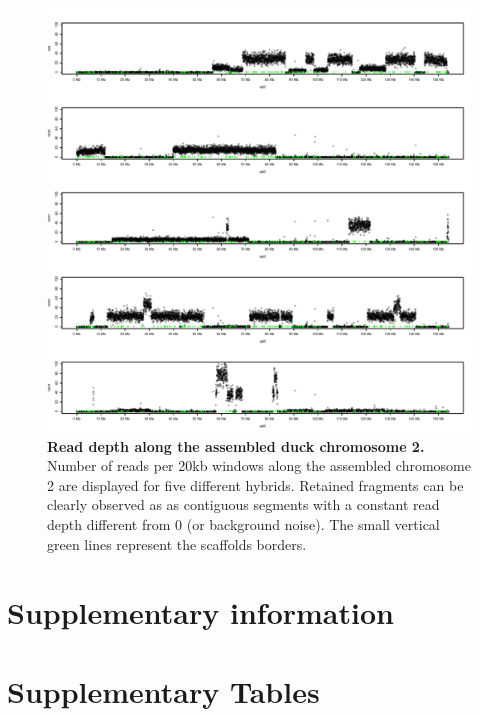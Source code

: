 \documentclass[10pt,letterpaper]{article}
\DeclareRobustCommand{\csentence}[1]{
    {\mathversion{bold}\bfseries #1}}
\begin{document}
\begin{figure}[h!]
   \includegraphics[scale=0.7]{figure3_genome_coverage.pdf}
  \caption{\csentence{Read depth along the assembled duck chromosome 2.}
      Number of reads per 20kb windows along the assembled chromosome 2 are displayed for five different hybrids. Retained fragments can be clearly observed as as contiguous segments with a constant read depth different from 0 (or background noise). The small vertical green lines represent the scaffolds borders.}
\label{fig3}    
\end{figure}

\clearpage
\newpage

\section*{Supplementary information} 


\renewcommand{\tablename}{Supplementary Table}

\section*{Supplementary Tables} 
\end{document}
